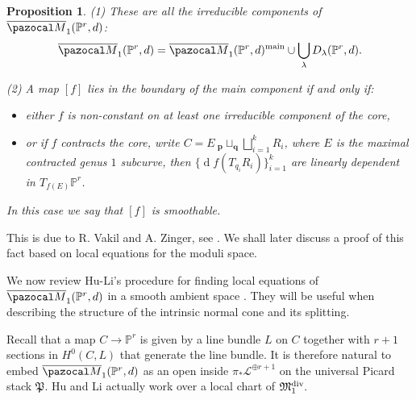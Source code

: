 \documentclass[11pt]{amsart}
\newcommand{\PP}{\mathbb P}
\renewcommand{\to}{\rightarrow}
\newcommand{\oM}{\overline{\pazocal M}}
\theoremstyle{plain}
\newtheorem{prop}[thm]{Proposition}
\theoremstyle{definition}
\begin{document}
\begin{prop}\label{prop:components}
\emph{(1)} These are all the irreducible components of $\oM_1(\PP^r,d)$: 
\[\oM_1(\PP^r,d)=\oM_1(\PP^r,d)^{\rm{main}}\cup\bigcup_{\lambda}D_{\lambda}(\PP^r,d).\]

\emph{(2)} A map $[f]$ lies in \emph{the boundary of the main component}  if and only if:
\begin{itemize}
\item either $f$ is non-constant on at least one irreducible component of the core,
\item or if $f$ contracts the core, write $C=E\ {}_{\mathbf p}\!\sqcup_{\mathbf q}\bigsqcup_{i=1}^k R_i$,  where $E$ is the \emph{maximal} contracted genus $1$ subcurve, then $\{\operatorname{d}\!f(T_{q_i}R_i)\}_{i=1}^k$ are \emph{linearly dependent} in $T_{f(E)}\PP^r$.
\end{itemize}
In this case we say that $[f]$ is smoothable.
\end{prop}
 
This is due to R. Vakil and A. Zinger, see \cite[Lemma~5.9]{Vre}\cite{VZpreview}. We shall later discuss a  proof of this fact based on local equations for the moduli space.

We now review Hu-Li's procedure for finding local equations of $\oM_1(\PP^r,d)$ in a smooth ambient space \cite{HL}. They will be useful when describing the structure of the intrinsic normal cone and its splitting.

Recall that a map $C\to\PP^r$ is given by a line bundle $L$ on $C$ together with $r+1$ sections in $H^0(C,L)$ that generate the line bundle. It is therefore natural to embed $\oM_1(\PP^r,d)$ as an open inside $\pi_*\mathcal L^{\oplus r+1}$ on the universal Picard stack $\mathfrak{P}$.
Hu and Li actually work over a local chart of $\mathfrak M_{1}^{\rm{div}}.$ 
\end{document}
